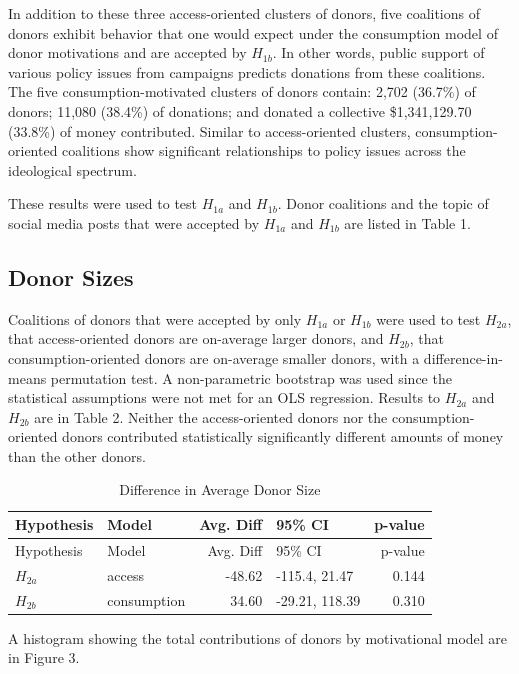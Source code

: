 \documentclass[12pt,]{article}
\begin{document}
In addition to these three access-oriented clusters of donors, five
coalitions of donors exhibit behavior that one would expect under the
consumption model of donor motivations and are accepted by \(H_{1b}\).
In other words, public support of various policy issues from campaigns
predicts donations from these coalitions. The five consumption-motivated
clusters of donors contain: 2,702 (36.7\%) of donors; 11,080 (38.4\%) of
donations; and donated a collective \$1,341,129.70 (33.8\%) of money
contributed. Similar to access-oriented clusters, consumption-oriented
coalitions show significant relationships to policy issues across the
ideological spectrum.

These results were used to test \(H_{1a}\) and \(H_{1b}\). Donor
coalitions and the topic of social media posts that were accepted by
\(H_{1a}\) and \(H_{1b}\) are listed in Table 1.

\hypertarget{donor-sizes}{%
\subsection{Donor Sizes}\label{donor-sizes}}

Coalitions of donors that were accepted by only \(H_{1a}\) or \(H_{1b}\)
were used to test \(H_{2a}\), that access-oriented donors are on-average
larger donors, and \(H_{2b}\), that consumption-oriented donors are
on-average smaller donors, with a difference-in-means permutation test.
A non-parametric bootstrap was used since the statistical assumptions
were not met for an OLS regression. Results to \(H_{2a}\) and \(H_{2b}\)
are in Table 2. Neither the access-oriented donors nor the
consumption-oriented donors contributed statistically significantly
different amounts of money than the other donors.

\begin{longtable}[]{@{}llrlr@{}}
\caption{Difference in Average Donor Size}\tabularnewline
\toprule
Hypothesis & Model & Avg. Diff & 95\% CI & p-value\tabularnewline
\midrule
\endfirsthead
\toprule
Hypothesis & Model & Avg. Diff & 95\% CI & p-value\tabularnewline
\midrule
\endhead
\(H_{2a}\) & access & -48.62 & -115.4, 21.47 & 0.144\tabularnewline
\(H_{2b}\) & consumption & 34.60 & -29.21, 118.39 & 0.310\tabularnewline
\bottomrule
\end{longtable}

A histogram showing the total contributions of donors by motivational
model are in Figure 3.
\end{document}
